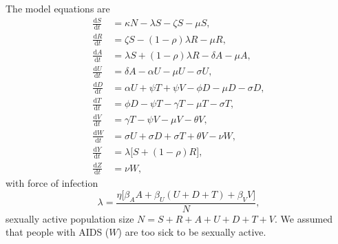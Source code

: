 \documentclass{article}
\newcommand{\md}{\mathrm{d}}
\begin{document}
The model equations are
\begin{equation}
  \label{model_eqns}
  \begin{split}
    \frac{\md S}{\md t} &= \kappa N - \lambda S - \zeta S- \mu S,
    \\
    \frac{\md R}{\md t} & = \zeta S - (1 - \rho) \lambda R - \mu R,
    \\
    \frac{\md A}{\md t} &= \lambda S + (1 - \rho) \lambda R - \delta A - \mu A,
    \\
    \frac{\md U}{\md t} &= \delta A - \alpha U - \mu U - \sigma U,
    \\
    \frac{\md D}{\md t} &=  \alpha U + \psi T + \psi V
    - \phi D - \mu D - \sigma D,
    \\
    \frac{\md T}{\md t} &= \phi D - \psi T - \gamma T - \mu T
    - \sigma T,
    \\
    \frac{\md V}{\md t} &= \gamma T - \psi V - \mu V - \theta V,
    \\
    \frac{\md W}{\md t} &= \sigma U + \sigma D + \sigma T + \theta V -
    \nu W,
    \\
    \frac{\md Y}{\md t} &= \lambda \big[S + (1 - \rho) R\big],
    \\
    \frac{\md Z}{\md t} &= \nu W,
  \end{split}
\end{equation}
with force of infection
\begin{equation}
  \label{force_of_infection}
  \lambda =
  \frac{\eta \big[\beta_A A + \beta_U (U + D + T) + \beta_V V\big]}{N},
\end{equation}
sexually active population size $N = S + R + A + U + D + T + V$.  We
assumed that people with AIDS ($W$) are too sick to be sexually
active.
\end{document}
